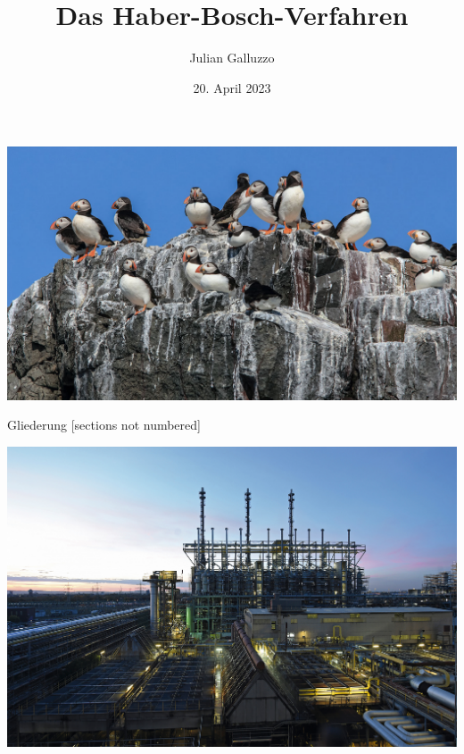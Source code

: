 \documentclass[
    aspectratio=1610
    ]{beamer}
\title{Das Haber-Bosch-Verfahren}
\date{20. April 2023}
\author{Julian Galluzzo}
\institute{Leistungskurs Chemie J1, Königin Olga-Stift Gymnasium}
\begin{document}
    \begin{frame}
        \begin{minipage}{11cm}\hspace{-2.5cm}
            \includegraphics[scale=.3]{figures/GuanoPuffins.png}
        \end{minipage}
    \end{frame}

    \maketitle

    \begin{frame}{Gliederung} 
        [sections not numbered]
        \begin{minipage}{6.75cm}
            \tableofcontents    
        \end{minipage}
        \begin{minipage}{1cm}
            \includegraphics[scale=.25]{figures/Pressefotos.jpg}
            \tiny
        \end{minipage}
    \end{frame}
\end{document}
